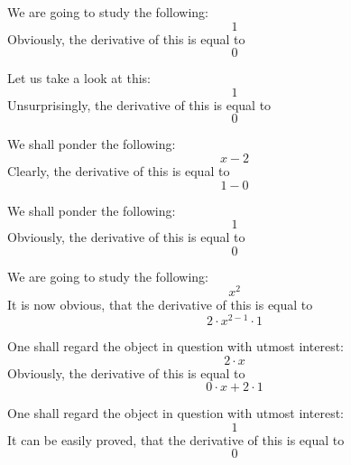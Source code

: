 \documentclass{article}
\begin{document}
We are going to study the following:
\begin{equation}
1 
\end{equation}
Obviously, the derivative of this is equal to
\begin{equation}
0 
\end{equation}

Let us take a look at this:
\begin{equation}
1 
\end{equation}
Unsurprisingly, the derivative of this is equal to
\begin{equation}
0 
\end{equation}

We shall ponder the following:
\begin{equation}
x - 2 
\end{equation}
Clearly, the derivative of this is equal to
\begin{equation}
1 - 0 
\end{equation}

We shall ponder the following:
\begin{equation}
1 
\end{equation}
Obviously, the derivative of this is equal to
\begin{equation}
0 
\end{equation}

We are going to study the following:
\begin{equation}
x ^{2 } 
\end{equation}
It is now obvious, that the derivative of this is equal to
\begin{equation}
2 \cdot x ^{2 - 1 } \cdot 1 
\end{equation}

One shall regard the object in question with utmost interest:
\begin{equation}
2 \cdot x 
\end{equation}
Obviously, the derivative of this is equal to
\begin{equation}
0 \cdot x + 2 \cdot 1 
\end{equation}

One shall regard the object in question with utmost interest:
\begin{equation}
1 
\end{equation}
It can be easily proved, that the derivative of this is equal to
\begin{equation}
0 
\end{equation}
\end{document}
